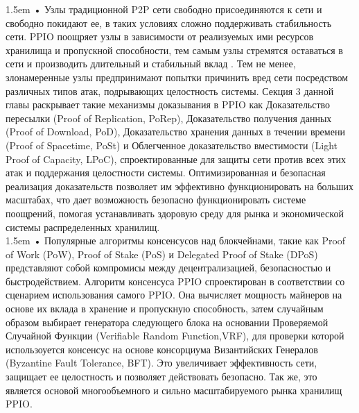 \documentclass[10pt,a4paper]{article}
\begin{document}
\hangindent 1.5em
\noindent   
• Узлы традиционной P2P сети свободно присоединяются к сети и свободно покидают ее, в таких условиях сложно поддерживать стабильность сети. PPIO поощряет узлы в зависимости от реализуемых ими ресурсов хранилища и пропускной способности, тем самым узлы стремятся оставаться в сети и производить длительный и стабильный вклад \cite{article1}. Тем не менее, злонамеренные узлы предпринимают попытки причинить вред сети посредством различных типов атак, подрывающих целостность системы. Секция 3 данной главы раскрывает такие механизмы доказывания в PPIO как Доказательство пересылки (Proof of Replication, PoRep), Доказательство получения данных (Proof of Download, PoD), Доказательство хранения данных в течении времени (Proof of Spacetime, PoSt) и Облегченное доказательство вместимости (Light Proof of Capacity, LPoC), спроектированные для защиты сети против всех этих атак и поддержания целостности системы. Оптимизированная и безопасная реализация доказательств позволяет им эффективно функционировать на больших масштабах, что дает возможность безопасно функционировать системе поощрений, помогая устанавливать здоровую среду для рынка и экономической системы распределенных хранилищ.
\vspace{-0.6em}
\\ 

\hangindent 1.5em
\noindent   
• Популярные алгоритмы консенсусов над блокчейнами, такие как Proof of Work (PoW), Proof of Stake (PoS) и Delegated Proof of Stake (DPoS) представляют собой компромисы между децентрализацией, безопасностью и быстродействием. Алгоритм консенсуса PPIO спроектирован в соответствии со сценарием использования самого PPIO. Она вычисляет мощность майнеров на основе их вклада в хранение и пропускную способность, затем случайным образом выбирает генератора следующего блока на основании Проверяемой Случайной Функции (Verifiable Random Function,VRF)\cite{article24}\cite{article25}, для проверки которой использоуется консенсус на основе консорциума Византийских Генералов (Byzantine Fault Tolerance, BFT). Это увеличивает эффективность сети, защищает ее целостность и позволяет действовать безопасно. Так же, это является основой многообъемного и сильно масштабируемого рынка хранилищ PPIO.
\vspace{-0.5em}
\end{document}
